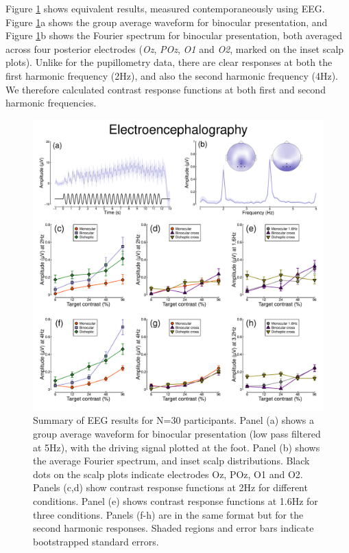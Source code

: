 \documentclass[
]{article}
\begin{document}
Figure \ref{fig:EEGdata} shows equivalent results, measured contemporaneously using EEG. Figure \ref{fig:EEGdata}a shows the group average waveform for binocular presentation, and Figure \ref{fig:EEGdata}b shows the Fourier spectrum for binocular presentation, both averaged across four posterior electrodes (\emph{Oz}, \emph{POz}, \emph{O1} and \emph{O2}, marked on the inset scalp plots). Unlike for the pupillometry data, there are clear responses at both the first harmonic frequency (2Hz), and also the second harmonic frequency (4Hz). We therefore calculated contrast response functions at both first and second harmonic frequencies.

\begin{figure}

{\centering \includegraphics{Figures/EEGdata} 

}

\caption{Summary of EEG results for N=30 participants. Panel (a) shows a group average waveform for binocular presentation (low pass filtered at 5Hz), with the driving signal plotted at the foot. Panel (b) shows the average Fourier spectrum, and inset scalp distributions. Black dots on the scalp plots indicate electrodes Oz, POz, O1 and O2. Panels (c,d) show contrast response functions at 2Hz for different conditions. Panel (e) shows contrast response functions at 1.6Hz for three conditions. Panels (f-h) are in the same format but for the second harmonic responses. Shaded regions and error bars indicate bootstrapped standard errors.}\label{fig:EEGdata}
\end{figure}
\end{document}
